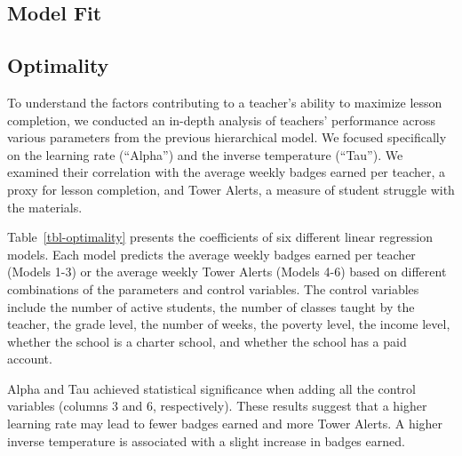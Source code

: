 \documentclass[
  number,
  preprint,
  3p,
  onecolumn]{elsarticle}
\begin{document}
\hypertarget{model-fit}{%
\subsection{Model Fit}\label{model-fit}}

\hypertarget{optimality}{%
\subsection{Optimality}\label{optimality}}

To understand the factors contributing to a teacher's ability to
maximize lesson completion, we conducted an in-depth analysis of
teachers' performance across various parameters from the previous
hierarchical model. We focused specifically on the learning rate
(``Alpha'') and the inverse temperature (``Tau''). We examined their
correlation with the average weekly badges earned per teacher, a proxy
for lesson completion, and Tower Alerts, a measure of student struggle
with the materials.

Table~\ref{tbl-optimality} presents the coefficients of six different
linear regression models. Each model predicts the average weekly badges
earned per teacher (Models 1-3) or the average weekly Tower Alerts
(Models 4-6) based on different combinations of the parameters and
control variables. The control variables include the number of active
students, the number of classes taught by the teacher, the grade level,
the number of weeks, the poverty level, the income level, whether the
school is a charter school, and whether the school has a paid account.

Alpha and Tau achieved statistical significance when adding all the
control variables (columns 3 and 6, respectively). These results suggest
that a higher learning rate may lead to fewer badges earned and more
Tower Alerts. A higher inverse temperature is associated with a slight
increase in badges earned.
\end{document}
